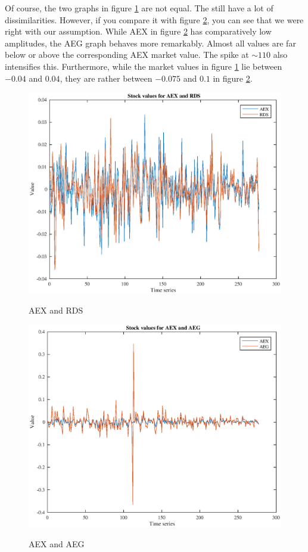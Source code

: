 \documentclass[a4paper]{article}
\begin{document}
Of course, the two graphs in figure \ref{ref:aex-rds} are not equal. The still have a lot of dissimilarities. However, if you compare it with figure \ref{ref:aex-aeg}, you can see that we were right with our assumption. While AEX in figure \ref{ref:aex-aeg} has comparatively low amplitudes, the AEG graph behaves more remarkably. Almost all values are far below or above the corresponding AEX market value. The spike at $\sim110$ also intensifies this. Furthermore, while the market values in figure \ref{ref:aex-rds} lie between $-0.04$ and $0.04$, they are rather between $-0.075$ and $0.1$ in figure \ref{ref:aex-aeg}.

\begin{figure}[H]
\begin{center}
\includegraphics[width=13cm]{AEX_RDS.eps}
\label{ref:aex-rds}
\end{center}
\caption{AEX and RDS}
\end{figure}

\begin{figure}[H]
\begin{center}
\includegraphics[width=13cm]{AEX_AEG.eps}
\label{ref:aex-aeg}
\end{center}
\caption{AEX and AEG}
\end{figure}
\end{document}
